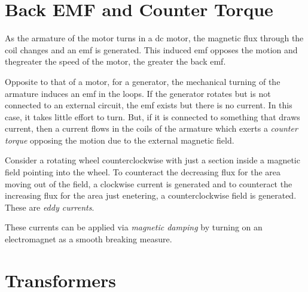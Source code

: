 \section{Back EMF and Counter Torque}

\begin{definition}
    As the armature of the motor turns in a dc motor, the magnetic flux through the coil changes and an emf is generated. This induced emf opposes the motion and thegreater the speed of the motor, the greater the back emf.
\end{definition}
\begin{definition}
    Opposite to that of a motor, for a generator, the mechanical turning of the armature induces an emf in the loops. If the generator rotates but is not connected to an external circuit, the emf exists but there is no current. In this case, it takes little effort to turn. But, if it is connected to something that draws current, then a current flows in the coils of the armature  which exerts a \emph{counter torque} opposing the motion due to the external magnetic field.
\end{definition}
\begin{definition}
    Consider a rotating wheel counterclockwise with just a section inside a magnetic field pointing into the wheel. To counteract the decreasing flux for the area moving out of the field, a clockwise current is generated  and to counteract the increasing flux for the area just enetering, a counterclockwise field is generated. These are \emph{eddy currents}.
\end{definition}
\begin{definition}
    These currents can be applied via \emph{magnetic damping} by turning on an electromagnet as a smooth breaking measure.
\end{definition}

\section{Transformers}

